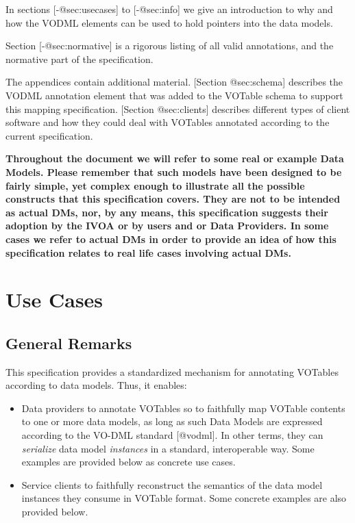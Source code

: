 \documentclass[11pt,a4paper]{ivoa}
\begin{document}
In sections {[}-@sec:usecases{]} to {[}-@sec:info{]} we give an
introduction to why and how the VODML elements can be used to hold
pointers into the data models.

Section {[}-@sec:normative{]} is a rigorous listing of all valid
annotations, and the normative part of the specification.

The appendices contain additional material. {[}Section @sec:schema{]}
describes the VODML annotation element that was added to the VOTable
schema to support this mapping specification. {[}Section @sec:clients{]}
describes different types of client software and how they could deal
with VOTables annotated according to the current specification.

\textbf{Throughout the document we will refer to some real or example
Data Models. Please remember that such models have been designed to be
fairly simple, yet complex enough to illustrate all the possible
constructs that this specification covers. They are not to be intended
as actual DMs, nor, by any means, this specification suggests their
adoption by the IVOA or by users and or Data Providers. In some cases we
refer to actual DMs in order to provide an idea of how this
specification relates to real life cases involving actual DMs.}

\section{Use Cases}\label{sec:usecases}

\subsection{General Remarks}\label{general-remarks}

This specification provides a standardized mechanism for annotating
VOTables according to data models. Thus, it enables:

\begin{itemize}
\itemsep1pt\parskip0pt
\item
  Data providers to annotate VOTables so to faithfully map VOTable
  contents to one or more data models, as long as such Data Models are
  expressed according to the VO-DML standard {[}@vodml{]}. In other
  terms, they can \emph{serialize} data model \emph{instances} in a
  standard, interoperable way. Some examples are provided below as
  concrete use cases.
\item
  Service clients to faithfully reconstruct the semantics of the data
  model instances they consume in VOTable format. Some concrete examples
  are also provided below.
\end{itemize}
\end{document}
